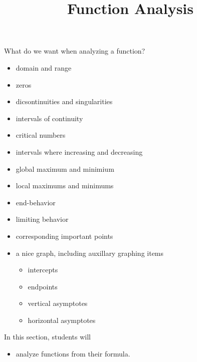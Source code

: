 \documentclass{ximera}
\title{Function Analysis}
\begin{document}
\begin{abstract}
%
\end{abstract}
\maketitle






What do we want when analyzing a function?


\begin{itemize}
\item domain and range
\item zeros 
\item dicsontinuities and singularities
\item intervals of continuity
\item critical numbers
\item intervals where increasing and decreasing
\item global maximum and minimium
\item local maximums and minimums
\item end-behavior
\item limiting behavior
\item corresponding important points
\item a nice graph, including auxillary graphing items
\begin{itemize}
	\item intercepts
	\item endpoints
	\item vertical asymptotes
	\item horizontal asymptotes
\end{itemize}
\end{itemize}




\begin{sectionOutcomes}
In this section, students will 

\begin{itemize}
\item analyze functions from their formula.
\end{itemize}
\end{sectionOutcomes}
\end{document}

